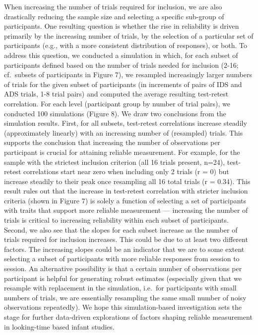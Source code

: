 \documentclass[
  english,
  man, donotrepeattitle,floatsintext]{apa6}
\begin{document}
When increasing the number of trials required for inclusion, we are also drastically reducing the sample size and selecting a specific sub-group of participants.
One resulting question is whether the rise in reliability is driven primarily by the increasing number of trials, by the selection of a particular set of participants (e.g., with a more consistent distribution of responses), or both.
To address this question, we conducted a simulation in which, for each subset of participants defined based on the number of trials needed for inclusion (2-16; cf.~subsets of participants in Figure 7), we resampled increasingly larger numbers of trials for the given subset of participants (in increments of pairs of IDS and ADS trials, 1-8 trial pairs) and computed the average resulting test-retest correlation.
For each level (participant group by number of trial pairs), we conducted 100 simulations (Figure 8).
We draw two conclusions from the simulation results.
First, for all subsets, test-retest correlations increase steadily (approximately linearly) with an increasing number of (resampled) trials.
This supports the conclusion that increasing the number of observations per participant is crucial for attaining reliable measurement.
For example, for the sample with the strictest inclusion criterion (all 16 trials present, n=24), test-retest correlations start near zero when including only 2 trials (r = 0) but increase steadily to their peak once resampling all 16 total trials (r = 0.34).
This result rules out that the increase in test-retest correlation with stricter inclusion criteria (shown in Figure 7) is solely a function of selecting a set of participants with traits that support more reliable measurement --- increasing the number of trials is critical to increasing reliability within each subset of participants.
Second, we also see that the slopes for each subset increase as the number of trials required for inclusion increases.
This could be due to at least two different factors.
The increasing slopes could be an indicator that we are to some extent selecting a subset of participants with more reliable responses from session to session.
An alternative possibility is that a certain number of observations per participant is helpful for generating robust estimates (especially given that we resample with replacement in the simulation, i.e.~for participants with small numbers of trials, we are essentially resampling the same small number of noisy observations repeatedly).
We hope this simulation-based investigation sets the stage for further data-driven explorations of factors shaping reliable measurement in looking-time based infant studies.
\end{document}
